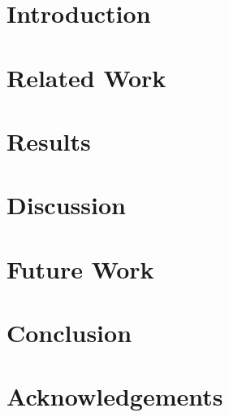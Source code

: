 \documentclass[a4paper, twocolumn]{article}
\begin{document}
\section{Introduction}
\section{Related Work}
\section{Results}
\section{Discussion}
\section{Future Work}
\section{Conclusion}
\section{Acknowledgements}




  
\end{document}
